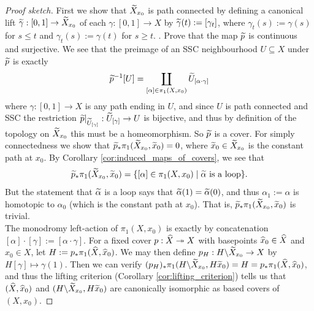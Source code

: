 \begin{proof}[Proof sketch]
	First we show that $\widetilde{X}_{x_0}$ is path connected by defining a canonical lift $\widetilde{\gamma} : [0,1] \to \widetilde{X}_{x_0}$ of each $\gamma : [0,1] \to X$ by $\widetilde{\gamma}(t) := [\gamma_t]$, where $\gamma_t(s) := \gamma(s)$ for $s \leq t$ and $\gamma_t(s) := \gamma(t)$ for $s \geq t$. \Exc. Prove that the map $\widetilde{p}$ is continuous and surjective. We see that the preimage of an SSC neighbourhood $U\subseteq X$ under $\widetilde{p}$ is exactly 
	\[
		\widetilde{p}^{-1}[U] = \coprod_{[\alpha] \in \pi_1(X, x_0)} \widetilde{U}_{[\alpha \cdot \gamma]}
	\]
	where $\gamma : [0,1] \to X$ is any path ending in $U$, and since $U$ is path connected and SSC the restriction $\widetilde{p}|_{\widetilde{U}_{[\gamma]}} : \widetilde{U}_{[\gamma]} \to U$ is bijective, and thus by definition of the topology on $\widetilde{X}_{x_0}$ this must be a homeomorphism. So $\widetilde{p}$ is a cover. For simply connectedness we show that $\widetilde{p}_* \pi_1(\widetilde{X}_{x_0}, \widetilde{x}_0) = 0$, where $\widetilde{x}_0 \in \widetilde{X}_{x_0}$ is the constant path at $x_0$. By Corollary \ref{cor:induced_maps_of_covers}, we see that 
	\[
		\widetilde{p}_*\pi_1(\widetilde{X}_{x_0}, \widetilde{x}_0) = \{[\alpha] \in \pi_1(X, x_0) \mid \widetilde{\alpha} \text{ is a loop}\}.
	\]
	But the statement that $\widetilde{\alpha}$ is a loop says that $\widetilde{\alpha}(1)= \widetilde{\alpha}(0)$, and thus $\alpha_1 := \alpha$ is homotopic to $\alpha_0$ (which is the constant path at $x_0$). That is, $\widetilde{p}_*\pi_1(\widetilde{X}_{x_0}, \widetilde{x}_0)$ is trivial.\\
	
	The monodromy left-action of $\pi_1(X,x_0)$ is exactly by concatenation $[\alpha] \cdot [\gamma] := [\alpha \cdot \gamma]$. For a fixed cover $p:\widehat{X} \twoheadrightarrow X$ with basepoints $\widehat{x}_0 \in \widehat{X}$ and $x_0 \in X$, let $H := p_*\pi_1(\widehat{X}, \widehat{x}_0)$. We may then define $p_H : H \backslash \widetilde{X}_{x_0} \to X$ by $H [\gamma] \mapsto \gamma(1)$. Then we can verify $(p_H)_* \pi_1(H \backslash \widetilde{X}_{x_0}, H\widetilde{x}_0) = H = p_* \pi_1(\widehat{X}, \widehat{x}_0)$, and thus the lifting criterion (Corollary \ref{cor:lifting_criterion}) tells us that $(\widehat{X}, \widehat{x}_0)$ and $(H \backslash \widetilde{X}_{x_0}, H\widetilde{x}_0)$ are canonically isomorphic as based covers of $(X, x_0)$.
\end{proof}


